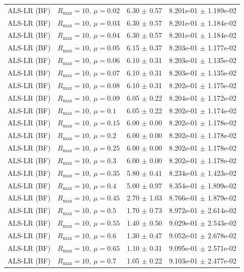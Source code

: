 \begin{table}[t]
\begin{tabular}{@{}llcc@{}}
ALS-LR (BF) & \(R_{\max}=10,\ \mu=0.02\) & 6.30 $\pm$ 0.57 & 8.201e-01 $\pm$ 1.189e-02 \\
ALS-LR (BF) & \(R_{\max}=10,\ \mu=0.03\) & 6.30 $\pm$ 0.57 & 8.201e-01 $\pm$ 1.184e-02 \\
ALS-LR (BF) & \(R_{\max}=10,\ \mu=0.04\) & 6.30 $\pm$ 0.57 & 8.201e-01 $\pm$ 1.184e-02 \\
ALS-LR (BF) & \(R_{\max}=10,\ \mu=0.05\) & 6.15 $\pm$ 0.37 & 8.203e-01 $\pm$ 1.177e-02 \\
ALS-LR (BF) & \(R_{\max}=10,\ \mu=0.06\) & 6.10 $\pm$ 0.31 & 8.203e-01 $\pm$ 1.135e-02 \\
ALS-LR (BF) & \(R_{\max}=10,\ \mu=0.07\) & 6.10 $\pm$ 0.31 & 8.203e-01 $\pm$ 1.135e-02 \\
ALS-LR (BF) & \(R_{\max}=10,\ \mu=0.08\) & 6.10 $\pm$ 0.31 & 8.202e-01 $\pm$ 1.175e-02 \\
ALS-LR (BF) & \(R_{\max}=10,\ \mu=0.09\) & 6.05 $\pm$ 0.22 & 8.204e-01 $\pm$ 1.172e-02 \\
ALS-LR (BF) & \(R_{\max}=10,\ \mu=0.1\) & 6.05 $\pm$ 0.22 & 8.202e-01 $\pm$ 1.174e-02 \\
ALS-LR (BF) & \(R_{\max}=10,\ \mu=0.15\) & 6.00 $\pm$ 0.00 & 8.202e-01 $\pm$ 1.178e-02 \\
ALS-LR (BF) & \(R_{\max}=10,\ \mu=0.2\) & 6.00 $\pm$ 0.00 & 8.202e-01 $\pm$ 1.178e-02 \\
ALS-LR (BF) & \(R_{\max}=10,\ \mu=0.25\) & 6.00 $\pm$ 0.00 & 8.202e-01 $\pm$ 1.178e-02 \\
ALS-LR (BF) & \(R_{\max}=10,\ \mu=0.3\) & 6.00 $\pm$ 0.00 & 8.202e-01 $\pm$ 1.178e-02 \\
ALS-LR (BF) & \(R_{\max}=10,\ \mu=0.35\) & 5.80 $\pm$ 0.41 & 8.234e-01 $\pm$ 1.423e-02 \\
ALS-LR (BF) & \(R_{\max}=10,\ \mu=0.4\) & 5.00 $\pm$ 0.97 & 8.354e-01 $\pm$ 1.899e-02 \\
ALS-LR (BF) & \(R_{\max}=10,\ \mu=0.45\) & 2.70 $\pm$ 1.03 & 8.766e-01 $\pm$ 1.879e-02 \\
ALS-LR (BF) & \(R_{\max}=10,\ \mu=0.5\) & 1.70 $\pm$ 0.73 & 8.972e-01 $\pm$ 2.614e-02 \\
ALS-LR (BF) & \(R_{\max}=10,\ \mu=0.55\) & 1.40 $\pm$ 0.50 & 9.029e-01 $\pm$ 2.543e-02 \\
ALS-LR (BF) & \(R_{\max}=10,\ \mu=0.6\) & 1.30 $\pm$ 0.47 & 9.052e-01 $\pm$ 2.678e-02 \\
ALS-LR (BF) & \(R_{\max}=10,\ \mu=0.65\) & 1.10 $\pm$ 0.31 & 9.095e-01 $\pm$ 2.571e-02 \\
ALS-LR (BF) & \(R_{\max}=10,\ \mu=0.7\) & 1.05 $\pm$ 0.22 & 9.103e-01 $\pm$ 2.477e-02 \\

\end{tabular}
\end{table}
